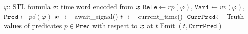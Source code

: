     \begin{algorithm}[H]
        \caption{$\textsf{SignEncode}(\varphi)$}
        \label{alg:signal-encoding} %
        \begin{algorithmic}[1]
            \Require $\varphi$: STL formula
            \Ensure $\sigma$: time word encoded from $\bm{x}$
            \State $\texttt{Rele} \gets rp(\varphi)$, $\texttt{Vari} \gets vv(\varphi)$,  $\texttt{Pred} \gets pd(\varphi)$ 
                \State $\bm{x}$ $\gets$ \textsf{await\_signal}() \label{line:await}
                \State $t$ $\gets$ \textsf{current\_time}() \label{line:time} 
                \State $\texttt{CurrPred}\gets$ Truth values of predicates $p\in \texttt{Pred}$ with respect to $\bm{x}$ at $t$\label{line:update value}
                \label{line:if condition}
                    \State Emit $(t,\texttt{CurrPred})$ \label{line: emit}
                \EndIf
            \EndWhile
        \end{algorithmic}
    \end{algorithm}

